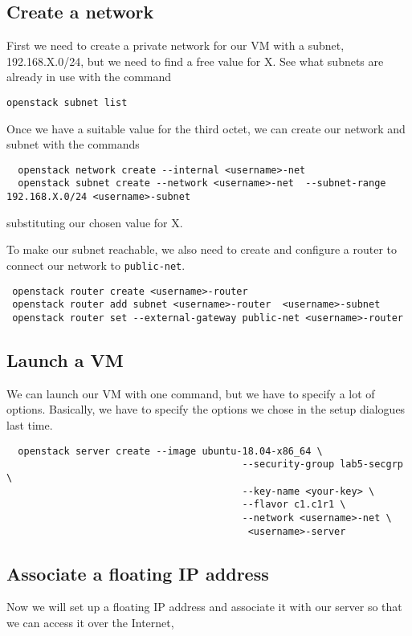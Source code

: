 \documentclass{article}
\begin{document}
\subsection{Create a network}
First we need to create a private network for our VM with a subnet, 192.168.X.0/24, but we need to find a free value for X. See what subnets are already in use with the command

 \texttt{openstack subnet list}
 
 Once we have a suitable value for the third octet, we can create our network and subnet with the commands

\begin{verbatim}
  openstack network create --internal <username>-net
  openstack subnet create --network <username>-net  --subnet-range 192.168.X.0/24 <username>-subnet
\end{verbatim}

substituting our chosen value for X.

To make our subnet reachable, we also need to create and configure a router to connect our network to \texttt{public-net}.

\begin{verbatim}
 openstack router create <username>-router
 openstack router add subnet <username>-router  <username>-subnet
 openstack router set --external-gateway public-net <username>-router
\end{verbatim}

\subsection{Launch a VM}
We can launch our VM with one command, but we have to specify a lot of options. Basically, we have to specify the options we chose in the setup dialogues last time.

\begin{verbatim}
  openstack server create --image ubuntu-18.04-x86_64 \
                                         --security-group lab5-secgrp \
                                         --key-name <your-key> \
                                         --flavor c1.c1r1 \
                                         --network <username>-net \
                                          <username>-server
\end{verbatim}

\subsection{Associate a floating IP address}
Now we will set up a floating IP address and associate it with our server so that we can access it over the Internet,
\end{document}
